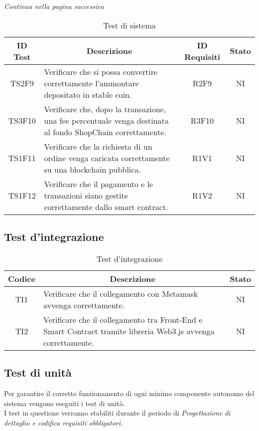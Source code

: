 \begin{center}
  \textit{\small Continua nella pagina successiva}
\end{center}
\begin{table}[H]
  \centering
  \renewcommand{\arraystretch}{1.8}
  \begin{tabular}{c|p{8cm}|c|c}
    \rowcolor[HTML]{125E28}
    \color[HTML]{FFFFFF}\textbf{ID Test}
    & \multicolumn{1}{c}{\color[HTML]{FFFFFF}\textbf{Descrizione}}
    & \color[HTML]{FFFFFF}\textbf{ID Requisiti}
    & \color[HTML]{FFFFFF}\textbf{Stato}\\
    \hline
    TS2F9 &	Verificare che si possa convertire correttamente l'ammontare depositato in stable coin. &	R2F9 &	NI \\
    TS3F10 &	Verificare che, dopo la transazione, una fee percentuale venga destinata al fondo ShopChain correttamente. & R3F10 &	NI \\
    TS1F11 &	Verificare che la richiesta di un ordine venga caricata correttamente su una blockchain pubblica. &	R1V1 &	NI \\
    TS1F12 &	Verificare che il pagamento e le transazioni siano gestite correttamente dallo smart contract. &	R1V2 &	NI \\
  \end{tabular}
  \caption{Test di sistema}
\end{table}

\subsection{Test d'integrazione}\label{subsection:test_integrazione}
\begin{table}[H]
  \centering
  \renewcommand{\arraystretch}{1.8}
  \begin{tabular}{c|p{8cm}|c}
    \rowcolor[HTML]{125E28}
    \color[HTML]{FFFFFF}\textbf{Codice}
    & \multicolumn{1}{c}{\color[HTML]{FFFFFF}\textbf{Descrizione}}
    & \color[HTML]{FFFFFF}\textbf{Stato}\\
    \hline
    TI1 & Verificare che il collegamento con Metamask avvenga correttamente. & NI \\
    TI2 & Verificare che il collegamento tra Front-End\glo{} e Smart Contract tramite libreria Web3.js avvenga correttamente. & NI \\
  \end{tabular}
  \caption{Test d'integrazione}
\end{table}

\subsection{Test di unità}\label{subsection:test_unita}
Per garantire il corretto funzionamento di ogni minimo componente autonomo del sistema vengono eseguiti i test di unità. \\
I test in questione verranno stabiliti durante il periodo di \textit{Progettazione di dettaglio e codifica requisiti obbligatori}.
